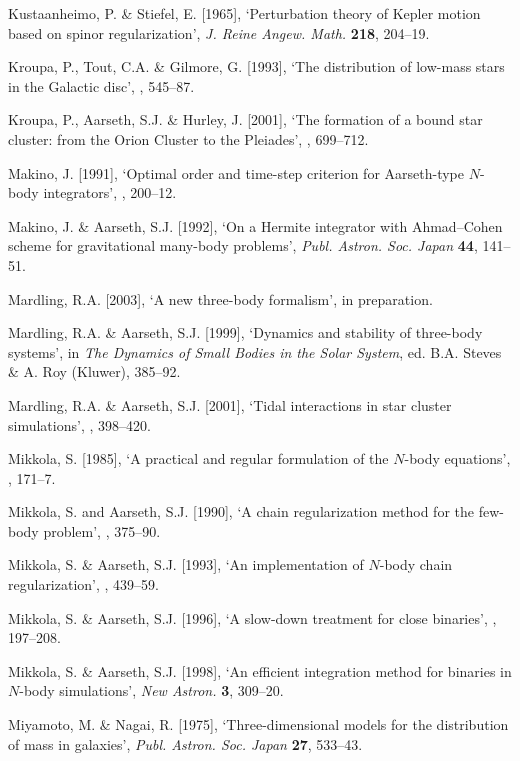 \documentclass[12pt]{article}
\begin{document}
\medskip
\noindent
Kustaanheimo, P. \& Stiefel, E. [1965], `Perturbation theory of Kepler motion
based on spinor regularization',
{\it J. Reine Angew. Math.} {\bf 218}, 204--19.

\medskip
\noindent
Kroupa, P., Tout, C.A. \& Gilmore, G. [1993], `The distribution of low-mass stars
in the Galactic disc',
, 545--87.

\medskip
\noindent
Kroupa, P., Aarseth, S.J. \& Hurley, J. [2001], `The formation of a bound star
cluster: from the Orion Cluster to the Pleiades', , 699--712.

\medskip
\noindent
Makino, J. [1991], `Optimal order and time-step criterion for Aarseth-type
$N$-body integrators', , 200--12.

\medskip
\noindent
Makino, J. \& Aarseth, S.J. [1992], `On a Hermite integrator with Ahmad--Cohen
scheme for gravitational many-body problems',
{\it Publ. Astron. Soc. Japan} {\bf 44}, 141--51.

\medskip
\noindent
Mardling, R.A. [2003], `A new three-body formalism', in preparation.

\medskip
\noindent
Mardling, R.A. \& Aarseth, S.J. [1999], `Dynamics and stability of three-body systems',
in {\it The Dynamics of Small Bodies in the Solar System}, ed. B.A. Steves \& A. Roy
(Kluwer), 385--92.

\medskip
\noindent
Mardling, R.A. \& Aarseth, S.J. [2001], `Tidal interactions in star cluster simulations',
, 398--420.

\medskip
\noindent
Mikkola, S. [1985], `A practical and regular formulation of the $N$-body equations',
, 171--7.

\medskip
\noindent
Mikkola, S. and Aarseth, S.J. [1990], `A chain regularization method for the
few-body problem',
, 375--90.

\medskip
\noindent
Mikkola, S. \& Aarseth, S.J. [1993], `An implementation of $N$-body chain
\hbox{regularization',}
, 439--59.

\medskip
\noindent
Mikkola, S. \& Aarseth, S.J. [1996], `A slow-down treatment for close binaries',
, 197--208.

\medskip
\noindent
Mikkola, S. \& Aarseth, S.J. [1998], `An efficient integration method for
binaries in $N$-body simulations',
{\it New Astron.} {\bf 3}, 309--20.

\medskip
\noindent
Miyamoto, M. \& Nagai, R. [1975], `Three-dimensional models for the distribution
of mass in galaxies', {\it Publ. Astron. Soc. Japan} {\bf 27}, 533--43.
\end{document}
